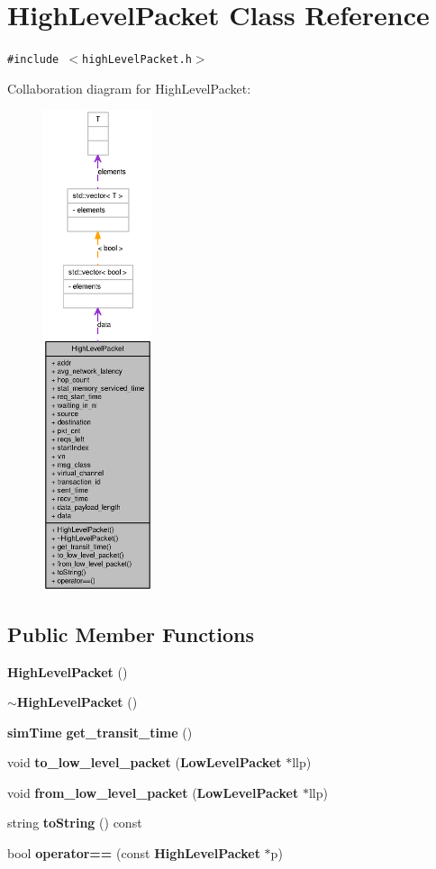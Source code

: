 \section{HighLevelPacket Class Reference}
\label{classHighLevelPacket}
{\tt \#include $<$highLevelPacket.h$>$}

Collaboration diagram for HighLevelPacket:\nopagebreak
\begin{figure}[H]
\begin{center}
\leavevmode
\includegraphics[height=400pt]{classHighLevelPacket__coll__graph}
\end{center}
\end{figure}
\subsection*{Public Member Functions}
\begin{CompactItemize}
\item 
{\bf HighLevelPacket} ()
\item 
{\bf $\sim$HighLevelPacket} ()
\item 
{\bf simTime} {\bf get\_\-transit\_\-time} ()
\item 
void {\bf to\_\-low\_\-level\_\-packet} ({\bf LowLevelPacket} $\ast$llp)
\item 
void {\bf from\_\-low\_\-level\_\-packet} ({\bf LowLevelPacket} $\ast$llp)
\item 
string {\bf toString} () const 
\item 
bool {\bf operator==} (const {\bf HighLevelPacket} $\ast$p)
\end{CompactItemize}
